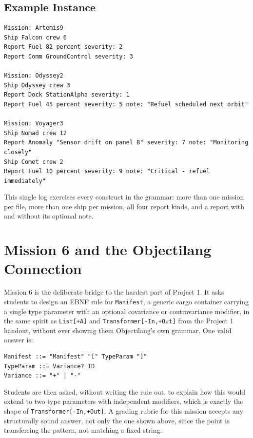 \documentclass[11pt]{article}
\begin{document}
\subsection{Example Instance}

\begin{lstlisting}[caption={A valid CosmosLog log, used throughout Missions 2, 4, and 5},label={lst:cosmos-example}]
Mission: Artemis9
Ship Falcon crew 6
Report Fuel 82 percent severity: 2
Report Comm GroundControl severity: 3

Mission: Odyssey2
Ship Odyssey crew 3
Report Dock StationAlpha severity: 1
Report Fuel 45 percent severity: 5 note: "Refuel scheduled next orbit"

Mission: Voyager3
Ship Nomad crew 12
Report Anomaly "Sensor drift on panel B" severity: 7 note: "Monitoring closely"
Ship Comet crew 2
Report Fuel 10 percent severity: 9 note: "Critical - refuel immediately"
\end{lstlisting}

This single log exercises every construct in the grammar: more than one
mission per file, more than one ship per mission, all four report kinds,
and a report with and without its optional note.

\section{Mission 6 and the Objectilang Connection}

\label{sec:mission6}
Mission 6 is the deliberate bridge to the hardest part of Project 1. It
asks students to design an EBNF rule for \texttt{Manifest}, a generic cargo
container carrying a single type parameter with an optional covariance or
contravariance modifier, in the same spirit as \texttt{List[+A]} and
\texttt{Transformer[-In,+Out]} from the Project 1 handout, without ever
showing them Objectilang's own grammar. One valid answer is:

\begin{lstlisting}[language=EBNF,caption={A valid Mission 6 answer for the Manifest rule}]
Manifest ::= "Manifest" "[" TypeParam "]"
TypeParam ::= Variance? ID
Variance ::= "+" | "-"
\end{lstlisting}

Students are then asked, without writing the rule out, to explain how this
would extend to two type parameters with independent modifiers, which is
exactly the shape of \texttt{Transformer[-In,+Out]}. A grading rubric for
this mission accepts any structurally sound answer, not only the one shown
above, since the point is transferring the pattern, not matching a fixed
string.
\end{document}
